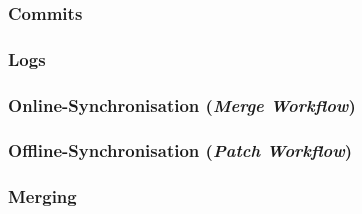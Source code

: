 \documentclass{cms-kurs}
\begin{document}
\begin{frame}
  \frametitle{Commits}

  \onslide<+->


\end{frame}

\begin{frame}
  \frametitle{Logs}

  \onslide<+->


\end{frame}

\begin{frame}
  \frametitle{Online-Synchronisation (\emph{Merge Workflow})}

  \onslide<+->


\end{frame}

\begin{frame}
  \frametitle{Offline-Synchronisation (\emph{Patch Workflow})}

  \onslide<+->


\end{frame}

\begin{frame}
  \frametitle{Merging}

  \onslide<+->


\end{frame}
\end{document}
